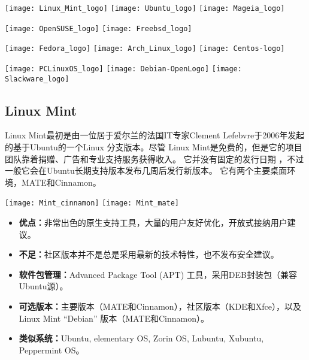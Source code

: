 \documentclass[11pt,fleqn]{book} %
\begin{document}
\texttt{[image: Linux\_Mint\_logo]}
\texttt{[image: Ubuntu\_logo]}
\texttt{[image: Mageia\_logo]}

\texttt{[image: OpenSUSE\_logo]}
\hspace{1.2cm}
\texttt{[image: Freebsd\_logo]}

\texttt{[image: Fedora\_logo]}
\texttt{[image: Arch\_Linux\_logo]}
\texttt{[image: Centos-logo]}

\texttt{[image: PCLinuxOS\_logo]}
\hspace{0.5cm}
\texttt{[image: Debian-OpenLogo]}
\hspace{0.5cm}
\texttt{[image: Slackware\_logo]}

\subsection{Linux Mint}
Linux Mint最初是由一位居于爱尔兰的法国IT专家Clement Lefebvre于2006年发起的基于Ubuntu的一个Linux
分支版本。尽管 Linux Mint是免费的，但是它的项目团队靠着捐赠、广告和专业支持服务获得收入。
它并没有固定的发行日期 ，不过一般它会在Ubuntu长期支持版本发布几周后发行新版本。
它有两个主要桌面环境，MATE和Cinnamon。

\noindent
\texttt{[image: Mint\_cinnamon]}
\texttt{[image: Mint\_mate]}

\begin{itemize}
  \item \textbf{优点：}非常出色的原生支持工具，大量的用户友好优化，开放式接纳用户建议。
  \item \textbf{不足：}社区版本并不是总是采用最新的技术特性，也不发布安全建议。
  \item \textbf{软件包管理：}Advanced Package Tool (APT) 工具，采用DEB封装包（兼容Ubuntu源）。
  \item \textbf{可选版本：}主要版本（MATE和Cinnamon），社区版本（KDE和Xfce），以及Linux Mint “Debian” 版本（MATE和Cinnamon）。
  \item \textbf{类似系统：}Ubuntu, elementary OS, Zorin OS, Lubuntu, Xubuntu, Peppermint OS。
\end{itemize}

\end{document}
